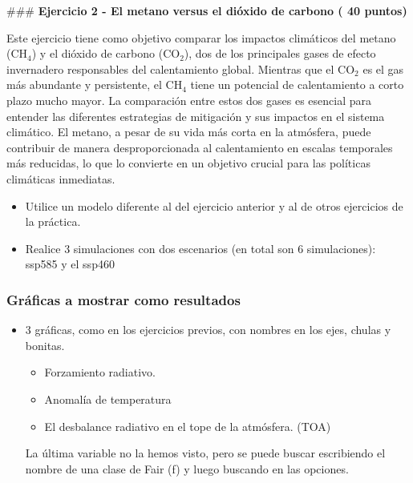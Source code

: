 \documentclass[11pt]{article}
\makeatletter
\providecommand{\tightlist}{%
      \setlength{\itemsep}{0pt}\setlength{\parskip}{0pt}}
\newcommand{\boxspacing}{\kern\kvtcb@left@rule\kern\kvtcb@boxsep}
\newcommand{\prompt}[4]{
        {\ttfamily\llap{{\color{#2}[#3]:\hspace{3pt}#4}}\vspace{-\baselineskip}}
    }
\makeatother
\begin{document}
    \begin{tcolorbox}[breakable, size=fbox, boxrule=1pt, pad at break*=1mm,colback=cellbackground, colframe=cellborder]
\prompt{In}{incolor}{ }{\boxspacing}
\begin{Verbatim}[commandchars=\\\{\}]

\end{Verbatim}
\end{tcolorbox}

    \#\#\# \textbf{ Ejercicio 2 - El metano versus el dióxido de carbono (
40 puntos) }

Este ejercicio tiene como objetivo comparar los impactos climáticos del
metano (CH\(_4\)) y el dióxido de carbono (CO\(_2\)), dos de los
principales gases de efecto invernadero responsables del calentamiento
global. Mientras que el CO\(_2\) es el gas más abundante y persistente,
el CH\(_4\) tiene un potencial de calentamiento a corto plazo mucho
mayor. La comparación entre estos dos gases es esencial para entender
las diferentes estrategias de mitigación y sus impactos en el sistema
climático. El metano, a pesar de su vida más corta en la atmósfera,
puede contribuir de manera desproporcionada al calentamiento en escalas
temporales más reducidas, lo que lo convierte en un objetivo crucial
para las políticas climáticas inmediatas.

\begin{itemize}
\tightlist
\item
  Utilice un modelo diferente al del ejercicio anterior y al de otros
  ejercicios de la práctica.
\item
  Realice 3 simulaciones con dos escenarios (en total son 6
  simulaciones): ssp585 y el ssp460
\end{itemize}

\hypertarget{gruxe1ficas-a-mostrar-como-resultados}{%
\subsubsection{Gráficas a mostrar como
resultados}\label{gruxe1ficas-a-mostrar-como-resultados}}

\begin{itemize}
\tightlist
\item
  3 gráficas, como en los ejercicios previos, con nombres en los ejes,
  chulas y bonitas.

  \begin{itemize}
  \tightlist
  \item
    Forzamiento radiativo.
  \item
    Anomalía de temperatura
  \item
    El desbalance radiativo en el tope de la atmósfera. (TOA)
  \end{itemize}

  La última variable no la hemos visto, pero se puede buscar escribiendo
  el nombre de una clase de Fair (f) y luego buscando en las opciones.
\end{itemize}
\end{document}
